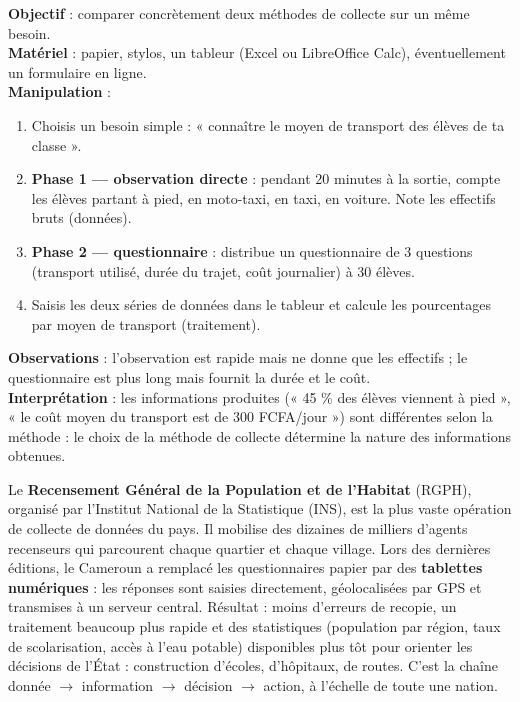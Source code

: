 \documentclass[11pt]{article}
\begin{document}
\begin{experience}
\textbf{Objectif} : comparer concrètement deux méthodes de collecte sur un même besoin.\\
\textbf{Matériel} : papier, stylos, un tableur (Excel ou LibreOffice Calc), éventuellement un formulaire en ligne.\\
\textbf{Manipulation} :
\begin{enumerate}
\item Choisis un besoin simple : « connaître le moyen de transport des élèves de ta classe ».
\item \textbf{Phase 1 — observation directe} : pendant 20 minutes à la sortie, compte les élèves partant à pied, en moto-taxi, en taxi, en voiture. Note les effectifs bruts (données).
\item \textbf{Phase 2 — questionnaire} : distribue un questionnaire de 3 questions (transport utilisé, durée du trajet, coût journalier) à 30 élèves.
\item Saisis les deux séries de données dans le tableur et calcule les pourcentages par moyen de transport (traitement).
\end{enumerate}
\textbf{Observations} : l'observation est rapide mais ne donne que les effectifs ; le questionnaire est plus long mais fournit la durée et le coût.\\
\textbf{Interprétation} : les informations produites (« 45 \% des élèves viennent à pied », « le coût moyen du transport est de 300 FCFA/jour ») sont différentes selon la méthode : le choix de la méthode de collecte détermine la nature des informations obtenues.
\end{experience}

\begin{savaistu}
Le \textbf{Recensement Général de la Population et de l'Habitat} (RGPH), organisé par l'Institut National de la Statistique (INS), est la plus vaste opération de collecte de données du pays. Il mobilise des dizaines de milliers d'agents recenseurs qui parcourent chaque quartier et chaque village. Lors des dernières éditions, le Cameroun a remplacé les questionnaires papier par des \textbf{tablettes numériques} : les réponses sont saisies directement, géolocalisées par GPS et transmises à un serveur central. Résultat : moins d'erreurs de recopie, un traitement beaucoup plus rapide et des statistiques (population par région, taux de scolarisation, accès à l'eau potable) disponibles plus tôt pour orienter les décisions de l'État : construction d'écoles, d'hôpitaux, de routes. C'est la chaîne donnée $\rightarrow$ information $\rightarrow$ décision $\rightarrow$ action, à l'échelle de toute une nation.
\end{savaistu}
\end{document}

